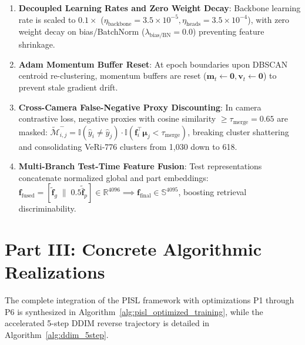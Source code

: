 \begin{enumerate}[itemsep=0.5pt,parsep=0pt,topsep=1pt,leftmargin=*]
    \item \textbf{Decoupled Learning Rates and Zero Weight Decay}: Backbone learning rate is scaled to $0.1\times$ ($\eta_{\text{backbone}} = 3.5 \times 10^{-5}, \eta_{\text{heads}} = 3.5 \times 10^{-4}$), with zero weight decay on bias/BatchNorm ($\lambda_{\text{bias/BN}} = 0.0$) preventing feature shrinkage.
    \item \textbf{Adam Momentum Buffer Reset}: At epoch boundaries upon DBSCAN centroid re-clustering, momentum buffers are reset ($\mathbf{m}_t \leftarrow \mathbf{0}, \mathbf{v}_t \leftarrow \mathbf{0}$) to prevent stale gradient drift.
    \item \textbf{Cross-Camera False-Negative Proxy Discounting}: In camera contrastive loss, negative proxies with cosine similarity $\ge \tau_{\text{merge}} = 0.65$ are masked: $\widetilde{\mathcal{M}}_{i, j}^- = \mathbb{I}(\hat{y}_i \neq \hat{y}_j) \cdot \mathbb{I}(\mathbf{f}_i^\top \boldsymbol{\mu}_j < \tau_{\text{merge}})$, breaking cluster shattering and consolidating VeRi-776 clusters from 1,030 down to 618.
    \item \textbf{Multi-Branch Test-Time Feature Fusion}: Test representations concatenate normalized global and part embeddings: $\mathbf{f}_{\text{fused}} = [\tilde{\mathbf{f}}_g \;\|\; 0.5 \tilde{\bar{\mathbf{f}}}_p] \in \mathbb{R}^{4096} \implies \mathbf{f}_{\text{final}} \in \mathbb{S}^{4095}$, boosting retrieval discriminability.
\end{enumerate}

\section{Part III: Concrete Algorithmic Realizations}
\label{sec:algorithms}

The complete integration of the PISL framework with optimizations P1 through P6 is synthesized in Algorithm~\ref{alg:pisl_optimized_training}, while the accelerated 5-step DDIM reverse trajectory is detailed in Algorithm~\ref{alg:ddim_5step}.

